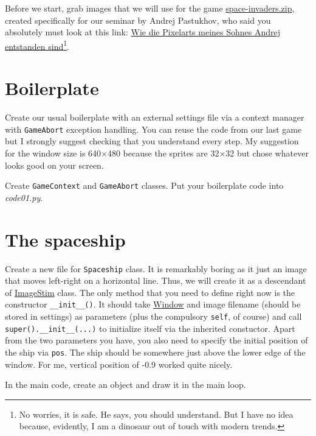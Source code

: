 \documentclass[
]{book}
\begin{document}
Before we start, grab images that we will use for the game \href{material/space-invaders.zip}{space-invaders.zip}, created specifically for our seminar by Andrej Pastukhov, who said you absolutely must look at this link: \href{https://youtu.be/dQw4w9WgXcQ}{Wie die Pixelarts meines Sohnes Andrej entstanden sind}\footnote{No worries, it is safe. He says, you should understand. But I have no idea because, evidently, I am a dinosaur out of touch with modern trends.}.

\hypertarget{boilerplate-2}{%
\section{Boilerplate}\label{boilerplate-2}}

Create our usual boilerplate with an external settings file via a context manager with \texttt{GameAbort} exception handling. You can reuse the code from our last game but I strongly suggest checking that you understand every step. My suggestion for the window size is 640×480 because the sprites are 32×32 but chose whatever looks good on your screen.

Create \texttt{GameContext} and \texttt{GameAbort} classes.
Put your boilerplate code into \emph{code01.py}.

\hypertarget{the-spaceship}{%
\section{The spaceship}\label{the-spaceship}}

Create a new file for \texttt{Spaceship} class. It is remarkably boring as it just an image that moves left-right on a horizontal line. Thus, we will create it as a descendant of \href{https://psychopy.org/api/visual/imagestim.html\#psychopy.visual.ImageStim}{ImageStim} class. The only method that you need to define right now is the constructor \texttt{\_\_init\_\_()}. It should take \href{https://psychopy.org/api/visual/window.html\#psychopy.visual.Window}{Window} and image filename (should be stored in settings) as parameters (plus the compulsory \texttt{self}, of course) and call \texttt{super().\_\_init\_\_(...)} to initialize itself via the inherited constuctor. Apart from the two parameters you have, you also need to specify the initial position of the ship via \texttt{pos}. The ship should be somewhere just above the lower edge of the window. For me, vertical position of -0.9 worked quite nicely.

In the main code, create an object and draw it in the main loop.
\end{document}
